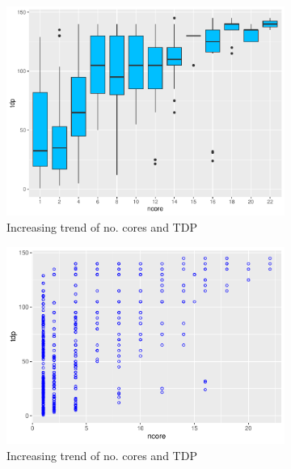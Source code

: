 \begin{figure}[H]
    \centering
    \begin{subfigure}[b]{0.45\textwidth}
        \centering
        \includegraphics[width=\textwidth]{./graphics/box_tdp_ncore.pdf}
        \caption{Increasing trend of no. cores and TDP}
    \end{subfigure}
    \hfill
    \begin{subfigure}[b]{0.45\textwidth}
        \centering
        \includegraphics[width=\textwidth]{./graphics/scatter_tdp_ncore.pdf}
        \caption{Increasing trend of no. cores and TDP}
        \label{fig:tdp_analysis_ncore}
    \end{subfigure}
    \hfill
    \begin{subfigure}[b]{0.45\textwidth}

\end{subfigure}
\end{figure}
